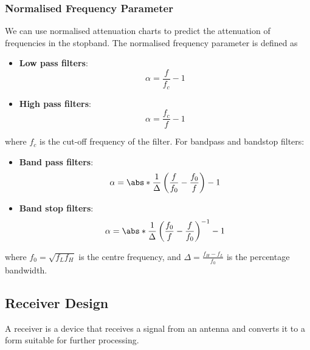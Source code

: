 \documentclass{article}
\begin{document}
\subsubsection{Normalised Frequency Parameter}
We can use normalised attenuation charts to predict the attenuation of
frequencies in the stopband. The normalised frequency parameter is
defined as
\begin{itemize}
    \item \textbf{Low pass filters}:
          \begin{equation*}
              \alpha = \frac{f}{f_c} - 1
          \end{equation*}
    \item \textbf{High pass filters}:
          \begin{equation*}
              \alpha = \frac{f_c}{f} - 1
          \end{equation*}
\end{itemize}
where \(f_c\) is the cut-off frequency of the filter.
For bandpass and bandstop filters:
\begin{itemize}
    \item \textbf{Band pass filters}:
          \begin{equation*}
              \alpha = \abs*{\frac{1}{\Delta} \left( \frac{f}{f_0} - \frac{f_0}{f} \right)} - 1
          \end{equation*}
    \item \textbf{Band stop filters}:
          \begin{equation*}
              \alpha = \abs*{\frac{1}{\Delta} \left( \frac{f_0}{f} - \frac{f}{f_0} \right)^{-1}} - 1
          \end{equation*}
\end{itemize}
where \(f_0 = \sqrt{f_L f_H}\) is the centre frequency, and
\(\Delta = \frac{f_H - f_L}{f_0}\) is the percentage bandwidth.
\subsection{Receiver Design}
A receiver is a device that receives a signal from an antenna and
converts it to a form suitable for further processing.
\end{document}
